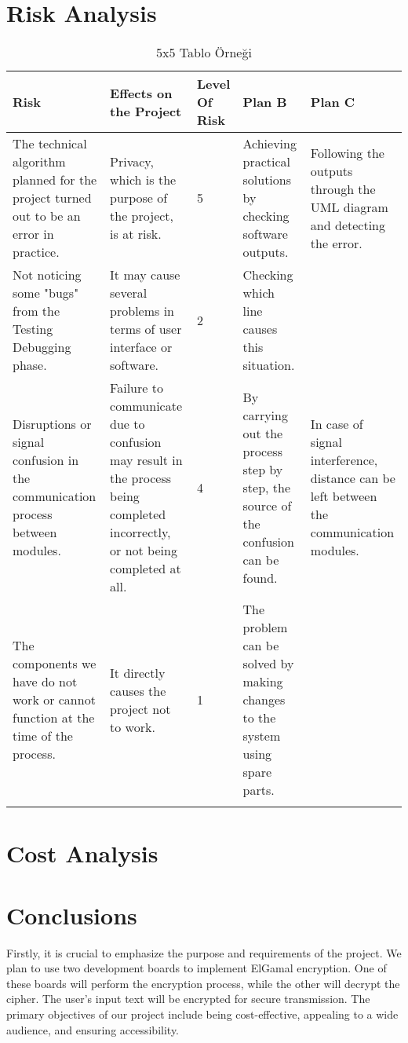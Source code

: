 \documentclass[12pt]{article}
\begin{document}
 	\newpage
 	\section{Risk Analysis}
 		
 
 	

 		\begin{longtable}{|p{3cm}|p{3cm}|p{1.6cm}|p{2cm}|p{2cm}|}
 			\hline
 			Risk  & Effects on the Project  & Level Of Risk  & Plan B & Plan C  \\
 			\hline
 		\endfirsthead
 	
 			The technical algorithm planned for the project turned out to be an error in practice.  & Privacy, which is the purpose of the project, is at risk.  & 5  & Achieving practical solutions by checking software outputs. & Following the outputs through the UML diagram and detecting the error.  \\	\hline
 			Not noticing some "bugs" from the Testing Debugging phase.  & It may cause several problems in terms of user interface or software.  & 2  & Checking which line causes this situation. &   \\	\hline
 			Disruptions or signal confusion in the communication process between modules.  & Failure to communicate due to confusion may result in the process being completed incorrectly, or not being completed at all.  & 4  & By carrying out the process step by step, the source of the confusion can be found.  & In case of signal interference, distance can be left between the communication modules.  \\	\hline
 			The components we have do not work or cannot function at the time of the process. & It directly causes the project not to work.  & 1  & The problem can be solved by making changes to the system using spare parts.  &   \\
 			\hline
 			\caption{5x5 Tablo Örneği}
 	
 		\end{longtable}
 	
 		
 
 	\newpage
 	\section{Cost Analysis}
 	\newpage
 		\section{Conclusions}
	
	Firstly, it is crucial to emphasize the purpose and requirements of the project. We plan to use two development boards to implement ElGamal encryption. One of these boards will perform the encryption process, while the other will decrypt the cipher. The user's input text will be encrypted for secure transmission. The primary objectives of our project include being cost-effective, appealing to a wide audience, and ensuring accessibility.\cite{koblitz2012course}
\end{document}
